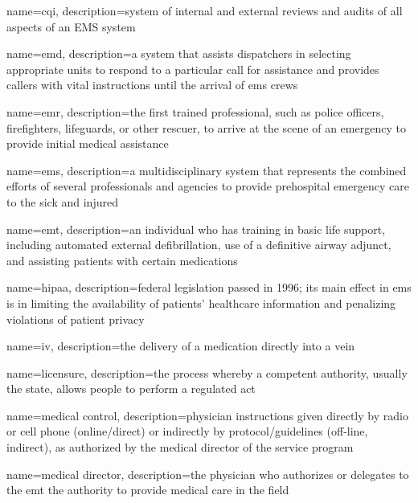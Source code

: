\documentclass[../EMT-169.tex]{subfiles}
\begin{document}
	{
		name=\acrfull{cqi},
		description={system of internal and external reviews and audits of all aspects of an EMS system}
	}

	{
		name=\acrfull{emd},
		description={a system that assists dispatchers in selecting appropriate units to respond to a particular call for assistance and provides callers with vital instructions until the arrival of \acrshort{ems} crews}
	}

	{
		name=\acrfull{emr},
		description={the first trained professional, such as police officers, firefighters, lifeguards, or other rescuer, to arrive at the scene of an emergency to provide initial medical assistance}
	}

	{
		name=\acrfull{ems},
		description={a multidisciplinary system that represents the combined efforts of several professionals and agencies to provide prehospital emergency care to the sick and injured}
	}

	{
		name=\acrfull{emt},
		description={an individual who has training in basic life support, including automated external defibrillation, use of a definitive airway adjunct, and assisting patients with certain medications}
	}

	{
		name=\acrfull{hipaa},
		description={federal legislation passed in 1996; its main effect in \acrshort{ems} is in limiting the availability of patients' healthcare information and penalizing violations of patient privacy}
	}
	
	{
		name=\acrfull{iv},
		description={the delivery of a medication directly into a vein}
	}
		
	{
		name=licensure,
		description={the process whereby a competent authority, usually the state, allows people to perform a regulated act}
	}
	
	{
		name=medical control,
		description={physician instructions given directly by radio or cell phone (online/direct) or indirectly by protocol/guidelines (off-line, indirect), as authorized by the medical director of the service program}
	}
	
	{
		name=medical director,
		description={the physician who authorizes or delegates to the \acrshort{emt} the authority to provide medical care in the field}
	}
\end{document}

